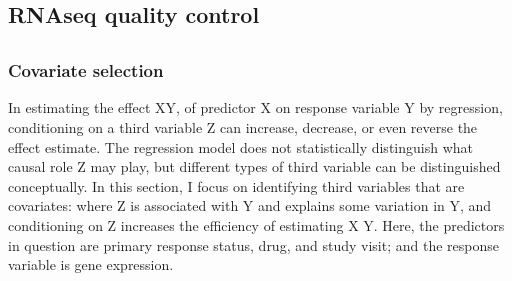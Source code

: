 \begin{outline}
%

\subsection{RNAseq quality control}

\subsection{}

\subsubsection{Covariate selection}

In estimating the effect X\textrightarrow Y, of predictor X on response variable Y by regression, 
conditioning on a third variable Z can increase, decrease, or even reverse the effect estimate.
The regression model does not statistically distinguish what causal role Z may play,
but different types of third variable can be distinguished conceptually.
In this section, I focus on identifying third variables that are covariates:
where Z is associated with Y and explains some variation in Y,
and conditioning on Z increases the efficiency of estimating X \textrightarrow Y.
Here, the predictors in question are primary response status, drug, and study visit; and the response variable is gene expression.


\end{outline}
